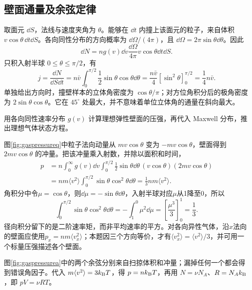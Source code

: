 \subsection{壁面通量及余弦定律}
\label{th:wallflux}
取面元 $\dd S$，法线与速度夹角为 $\theta$。能够在 $\dd t$ 内撞上该面元的粒子，来自体积 $v\cos\theta\,\dd t\dd S$。各向同性分布的方向概率为 $\dd\Omega/(4\pi)$，且 $\dd\Omega=2\pi\sin\theta\dd\theta$。因此
\[
 \dd N=n g(v)\dd v\frac{\dd\Omega}{4\pi}
 v\cos\theta\dd t\dd S.
\]
只积入射半球 $0\le\theta\le\pi/2$，有
\[
 j=\frac{\dd N}{\dd S\dd t}=n\bar v\int_0^{\pi/2}\frac12\sin\theta\cos\theta\dd\theta
=\frac{n\bar v}{4}[\sin^2\theta]_0^{\pi/2}
 =\frac14n\bar v.
\]
单独给出方向时，撞壁样本的立体角密度为 $\cos\theta/\pi$；对方位角积分后的极角密度为 $2\sin\theta\cos\theta$。它在 $45^\circ$ 处最大，并不意味着单位立体角的通量在斜向最大。

\begin{example}[由撞壁冲量求气体压强]\label{ex:gaspressure}
用各向同性速率分布 $g(v)$ 计算理想弹性壁面的压强，再代入 Maxwell 分布，推出理想气体状态方程。
\end{example}
\begin{solution}
图\ref{fig:gaspressureq}中粒子法向动量从 $mv\cos\theta$ 变为 $-mv\cos\theta$，壁面得到 $2mv\cos\theta$ 的冲量。把该冲量乘入射数，并除以面积和时间，
\begin{align*}
 p&=n\int_0^\infty g(v)\dd v\int_0^{\pi/2}
 \frac12\sin\theta\dd\theta\,(v\cos\theta)(2mv\cos\theta)\\
 &=nm\langle v^2\rangle\int_0^{\pi/2}\sin\theta\cos^2\theta\dd\theta
 =\frac13nm\langle v^2\rangle.
\end{align*}
角积分中令$\mu=\cos\theta$，则$\dd\mu=-\sin\theta\dd\theta$，入射半球对应$\mu$从1降至0，所以
\[
 \int_0^{\pi/2}\sin\theta\cos^2\theta\dd\theta
 =-\int_1^0\mu^2\dd\mu
 =\left[\frac{\mu^3}3\right]_0^1=\frac13.
\]
径向积分留下的是二阶速率矩，而非平均速率的平方。对各向异性气体，沿$x$法向的壁面应使用$p_x=nm\langle v_x^2\rangle$；本题因三个方向等价，才有$\langle v_x^2\rangle=\langle v^2\rangle/3$，并可用一个标量压强描述各个壁面。

图\ref{fig:gaspressurea}中的两个余弦分别来自扫掠体积和冲量；漏掉任何一个都会得到错误角因子。代入 $m\langle v^2\rangle=3k_{\mathrm B} T$，得 $p=nk_{\mathrm B} T$，再用 $N=\nu N_A$、$R=N_Ak_{\mathrm B}$，即 $pV=\nu RT$。
\end{solution}

